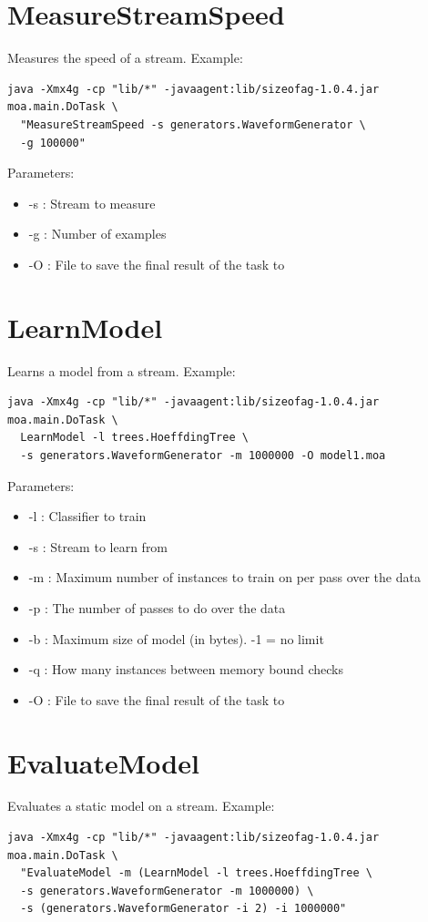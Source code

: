 \documentclass[a4paper,12pt,twoside]{book}
\begin{document}
\section{MeasureStreamSpeed} 
Measures the speed of a stream. Example:

\begin{footnotesize}\begin{verbatim}
java -Xmx4g -cp "lib/*" -javaagent:lib/sizeofag-1.0.4.jar moa.main.DoTask \
  "MeasureStreamSpeed -s generators.WaveformGenerator \
  -g 100000" 
\end{verbatim}\end{footnotesize}

Parameters:
\begin{itemize}
\item -s : Stream to measure
\item -g : Number of examples
\item -O : File to save the final result of the task to
\end{itemize}

\section{LearnModel} 
Learns a model from a stream.
Example:
\begin{footnotesize}\begin{verbatim}
java -Xmx4g -cp "lib/*" -javaagent:lib/sizeofag-1.0.4.jar moa.main.DoTask \
  LearnModel -l trees.HoeffdingTree \
  -s generators.WaveformGenerator -m 1000000 -O model1.moa
\end{verbatim}\end{footnotesize}

Parameters:
\begin{itemize}
\item -l : Classifier to train
\item -s : Stream to learn from
\item -m : Maximum number of instances to train on per pass over the data
\item -p : The number of passes to do over the data
\item -b : Maximum size of model (in bytes). -1 = no limit
\item -q : How many instances between memory bound checks
\item -O : File to save the final result of the task to
\end{itemize}

\section{EvaluateModel} 
Evaluates a static model on a stream.
Example:
\begin{footnotesize}\begin{verbatim}
java -Xmx4g -cp "lib/*" -javaagent:lib/sizeofag-1.0.4.jar moa.main.DoTask \
  "EvaluateModel -m (LearnModel -l trees.HoeffdingTree \
  -s generators.WaveformGenerator -m 1000000) \
  -s (generators.WaveformGenerator -i 2) -i 1000000"
\end{verbatim}\end{footnotesize}
\end{document}
